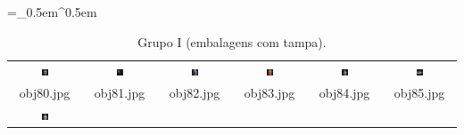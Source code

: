 \begin{table}[H]
  \centering
  \caption{Grupo I (embalagens com tampa).}
  \tabulinesep =_0.5em^0.5em
  \everyrow{\tabucline[0.4pt]-}
  \begin{tabu}{|cccccc|}
    \includegraphics[width=0.1\textwidth,height=0.1\textwidth]{imagens/coil_100/embalagens_tampas/obj5__0.png} &
    \includegraphics[width=0.1\textwidth,height=0.1\textwidth]{imagens/coil_100/embalagens_tampas/obj5__0_1.png} &
    \includegraphics[width=0.1\textwidth,height=0.1\textwidth]{imagens/coil_100/embalagens_tampas/obj13__40.png} &
    \includegraphics[width=0.1\textwidth,height=0.1\textwidth]{imagens/coil_100/embalagens_tampas/obj24__0.png} &
    \includegraphics[width=0.1\textwidth,height=0.1\textwidth]{imagens/coil_100/embalagens_tampas/obj33__0.png} &
    \includegraphics[width=0.1\textwidth,height=0.1\textwidth]{imagens/coil_100/embalagens_tampas/obj33__0_1.png}
    \\
    \scriptsize{obj80.jpg} & \scriptsize{obj81.jpg} & \scriptsize{obj82.jpg} &
    \scriptsize{obj83.jpg} & \scriptsize{obj84.jpg} & \scriptsize{obj85.jpg}
    \\
    \includegraphics[width=0.1\textwidth,height=0.1\textwidth]{imagens/coil_100/embalagens_tampas/obj50__0.png} &

\end{tabu}
\end{table}
